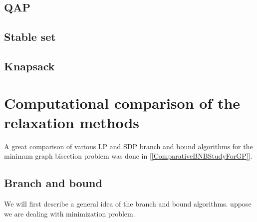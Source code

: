 \documentclass[12pt]{book}
\theoremstyle{definition}
\begin{document}
\section{QAP}

\section{Stable set}

\section{Knapsack}






\chapter{Computational comparison of the relaxation methods}

A great comparison of various LP and SDP branch and bound algorithms for the minimum graph bisection problem was done in [\ref{ComparativeBNBStudyForGP}].





\section{Branch and bound}



We will first describe a general idea of the branch and bound algorithms.  uppose we are dealing with minimization problem.
\end{document}
